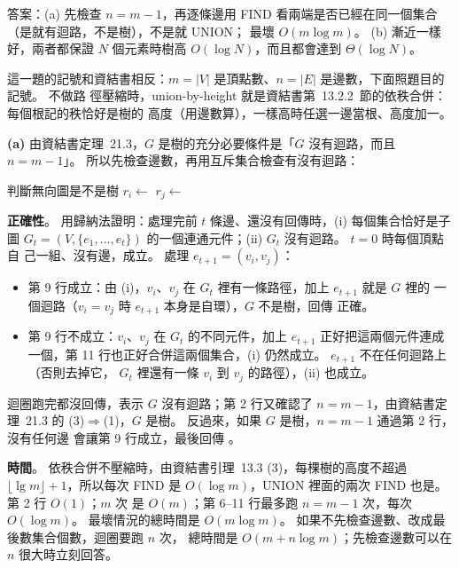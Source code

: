 \begin{pastsoln}
答案：(a) 先檢查 $n = m - 1$，再逐條邊用 FIND 看兩端是否已經在同一個集合（是就有迴路，不是樹），不是就 UNION；
最壞 $O(m \log m)$。 (b) 漸近一樣好，兩者都保證 $N$ 個元素時樹高 $O(\log N)$，而且都會達到 $\Theta(\log N)$。

這一題的記號和資結書相反：$m = |V|$ 是頂點數、$n = |E|$ 是邊數，下面照題目的記號。 不做路
徑壓縮時，union-by-height 就是資結書第~13.2.2~節的依秩合併：每個根記的秩恰好是樹的
高度（用邊數算），一樣高時任選一邊當根、高度加一。

\textbf{(a)} 由資結書定理~21.3，$G$ 是樹的充分必要條件是「$G$ 沒有迴路，而且 $n = m - 1$」。
所以先檢查邊數，再用互斥集合檢查有沒有迴路：

\begin{pseudo}[unbreakable]{判斷無向圖是不是樹}
        \State \Return \FALSE
    \EndIf
        \State {}
    \EndFor
        \State $r_i \gets$ 
        \State $r_j \gets$ 
            \State \Return \FALSE {}
        \EndIf
        \State {}
    \EndFor
    \State \Return \TRUE
\EndFunction
\end{pseudo}

\textbf{正確性}。 用歸納法證明：處理完前 $t$ 條邊、還沒有回傳時，(i) 每個集合恰好是子圖
$G_t = (V, \{e_1, \ldots, e_t\})$ 的一個連通元件；(ii) $G_t$ 沒有迴路。 $t = 0$ 時每個頂點自
己一組、沒有邊，成立。 處理 $e_{t+1} = (v_i, v_j)$：
\begin{itemize}
\item 第 9 行成立：由 (i)，$v_i$、$v_j$ 在 $G_t$ 裡有一條路徑，加上 $e_{t+1}$ 就是 $G$ 裡的
一個迴路（$v_i = v_j$ 時 $e_{t+1}$ 本身是自環），$G$ 不是樹，回傳 \FALSE{} 正確。
\item 第 9 行不成立：$v_i$、$v_j$ 在 $G_t$ 的不同元件，加上 $e_{t+1}$ 正好把這兩個元件連成
一個，第 11 行也正好合併這兩個集合，(i) 仍然成立。 $e_{t+1}$ 不在任何迴路上（否則去掉它，
$G_t$ 裡還有一條 $v_i$ 到 $v_j$ 的路徑），(ii) 也成立。
\end{itemize}
迴圈跑完都沒回傳，表示 $G$ 沒有迴路；第 2 行又確認了 $n = m - 1$，由資結書定理~21.3
的 (3)$\Rightarrow$(1)，$G$ 是樹。 反過來，如果 $G$ 是樹，$n = m - 1$ 通過第 2 行，沒有任何邊
會讓第 9 行成立，最後回傳 \TRUE。

\textbf{時間}。 依秩合併不壓縮時，由資結書引理~13.3 (3)，每棵樹的高度不超過
$\lfloor \lg m \rfloor + 1$，所以每次 FIND 是 $O(\log m)$，UNION 裡面的兩次 FIND 也是。 第 2 行
$O(1)$；$m$ 次  是 $O(m)$；第 6--11 行最多跑 $n = m - 1$ 次，每次 $O(\log m)$。
最壞情況的總時間是 $O(m \log m)$。 如果不先檢查邊數、改成最後數集合個數，迴圈要跑 $n$ 次，
總時間是 $O(m + n \log m)$；先檢查邊數可以在 $n$ 很大時立刻回答。


\end{pastsoln}
